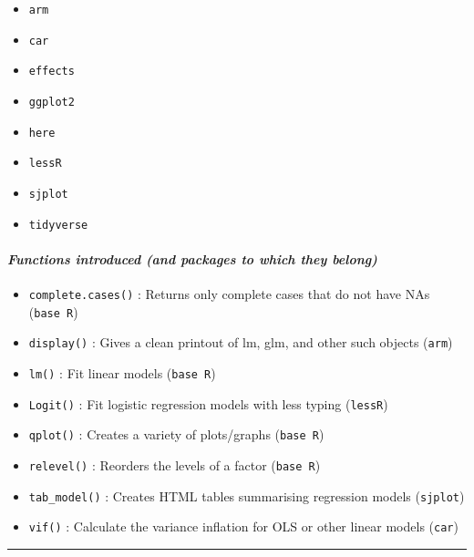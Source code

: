 \documentclass[
]{book}
\providecommand{\tightlist}{%
  \setlength{\itemsep}{0pt}\setlength{\parskip}{0pt}}
\begin{document}
\begin{itemize}
\tightlist
\item
  \texttt{arm}
\item
  \texttt{car}
\item
  \texttt{effects}
\item
  \texttt{ggplot2}
\item
  \texttt{here}
\item
  \texttt{lessR}
\item
  \texttt{sjplot}
\item
  \texttt{tidyverse}
\end{itemize}

\hypertarget{functions-introduced-and-packages-to-which-they-belong-8}{%
\paragraph*{\texorpdfstring{\emph{Functions introduced (and packages to which they belong)}}{Functions introduced (and packages to which they belong)}}\label{functions-introduced-and-packages-to-which-they-belong-8}}

\begin{itemize}
\tightlist
\item
  \texttt{complete.cases()} : Returns only complete cases that do not have NAs (\texttt{base\ R})
\item
  \texttt{display()} : Gives a clean printout of lm, glm, and other such objects (\texttt{arm})
\item
  \texttt{lm()} : Fit linear models (\texttt{base\ R})
\item
  \texttt{Logit()} : Fit logistic regression models with less typing (\texttt{lessR})
\item
  \texttt{qplot()} : Creates a variety of plots/graphs (\texttt{base\ R})
\item
  \texttt{relevel()} : Reorders the levels of a factor (\texttt{base\ R})
\item
  \texttt{tab\_model()} : Creates HTML tables summarising regression models (\texttt{sjplot})
\item
  \texttt{vif()} : Calculate the variance inflation for OLS or other linear models (\texttt{car})
\end{itemize}

\begin{center}\rule{0.5\linewidth}{0.5pt}\end{center}
\end{document}
